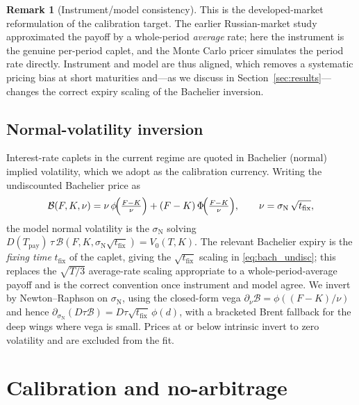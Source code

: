 \documentclass[11pt]{article}
\newcommand{\Fwd}{F}
\newcommand{\Nvol}{\sigma_{\mathrm N}}
\theoremstyle{plain}
\theoremstyle{definition}
\newtheorem{remark}{Remark}
\begin{document}
\begin{remark}[Instrument/model consistency]
This is the developed-market reformulation of the calibration target. The
earlier Russian-market study approximated the payoff by a whole-period
\emph{average} rate; here the instrument is the genuine per-period caplet, and
the Monte Carlo pricer simulates the period rate directly. Instrument and model
are thus aligned, which removes a systematic pricing bias at short maturities
and---as we discuss in Section~\ref{sec:results}---changes the correct expiry
scaling of the Bachelier inversion.
\end{remark}

\subsection{Normal-volatility inversion}

Interest-rate caplets in the current regime are quoted in Bachelier (normal)
implied volatility, which we adopt as the calibration currency. Writing the
undiscounted Bachelier price as
\begin{equation}
\mathcal B(\Fwd, K, \nu) = \nu\,\phi\!\Bigl(\tfrac{\Fwd-K}{\nu}\Bigr)
   + (\Fwd-K)\,\Phi\!\Bigl(\tfrac{\Fwd-K}{\nu}\Bigr),
   \qquad \nu = \Nvol\,\sqrt{t_{\mathrm{fix}}},
\label{eq:bach_undisc}
\end{equation}
the model normal volatility is the $\Nvol$ solving $D(T_{\mathrm{pay}})\,\tau\,
\mathcal B(\Fwd,K,\Nvol\sqrt{t_{\mathrm{fix}}}) = V_0(T,K)$. The relevant Bachelier
expiry is the \emph{fixing time} $t_{\mathrm{fix}}$ of the caplet, giving the
$\sqrt{t_{\mathrm{fix}}}$ scaling in \eqref{eq:bach_undisc}; this replaces the
$\sqrt{T/3}$ average-rate scaling appropriate to a whole-period-average payoff
and is the correct convention once instrument and model agree. We invert by
Newton--Raphson on $\Nvol$, using the closed-form vega $\partial_\nu \mathcal B =
\phi((\Fwd-K)/\nu)$ and hence $\partial_{\Nvol}(D\tau\mathcal B) = D\tau
\sqrt{t_{\mathrm{fix}}}\,\phi(d)$, with a bracketed Brent fallback for the deep
wings where vega is small. Prices at or below intrinsic invert to zero
volatility and are excluded from the fit.

\section{Calibration and no-arbitrage}
\label{sec:calib}
\end{document}
